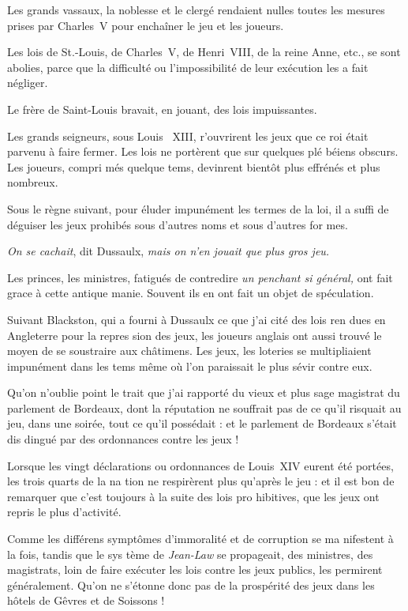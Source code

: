 Les grands vassaux, la noblesse et
le clergé rendaient nulles toutes les
mesures prises par Charles~V pour
enchaîner le jeu et les joueurs.

Les lois de St.-Louis, de Charles~V,
de Henri~VIII, de la reine Anne, etc.,
se sont abolies, parce que la difficulté
ou l'impossibilité de leur exécution
les a fait négliger.

Le frère de Saint-Louis bravait, en
jouant, des lois impuissantes.

Les grands seigneurs, sous Louis~%
XIII, r'ouvrirent les jeux que ce roi
était parvenu à faire fermer. Les lois
ne portèrent que sur quelques plé%
béiens obscurs. Les joueurs, compri%
més quelque tems, devinrent bientôt
plus effrénés et plus nombreux.

Sous le règne suivant, pour éluder 
impunément les termes de la loi, il a
suffi de déguiser les jeux prohibés sous
d'autres noms et sous d'autres for%
mes.

\emph{On se cachait}, dit Dussaulx, \emph{mais
on n'en jouait que plus gros jeu.}

Les princes, les ministres, fatigués
de contredire \emph{un penchant si général,}
ont fait grace à cette antique manie.
Souvent ils en ont fait un objet de
spéculation.

Suivant Blackston, qui a fourni à
Dussaulx ce que j'ai cité des lois ren%
dues en Angleterre pour la repres%
sion des jeux, les joueurs anglais ont
aussi trouvé le moyen de se soustraire
aux châtimens. Les jeux, les loteries
se multipliaient impunément dans les
tems même où l'on paraissait le plus 
sévir contre eux.

Qu'on n'oublie point le trait que
j'ai rapporté du vieux et plus sage
magistrat du parlement de Bordeaux,
dont la réputation ne souffrait pas de 
ce qu'il risquait au jeu, dans une
soirée, tout ce qu'il possédait : et le
parlement de Bordeaux s'était dis%
dingué par des ordonnances contre
les jeux !

Lorsque les vingt déclarations ou
ordonnances de Louis~XIV eurent
été portées, les trois quarts de la na%
tion ne respirèrent plus qu'après le
jeu : et il est bon de remarquer que
c'est toujours à la suite des lois pro%
hibitives, que les jeux ont repris le
plus d'activité.

Comme les différens symptômes
d'immoralité et de corruption se ma%
nifestent à la fois, tandis que le sys%
tème de \emph{Jean-Law} se propageait,
des ministres, des magistrats, loin de
faire exécuter les lois contre les jeux
publics, les permirent généralement.
Qu'on ne s'étonne donc pas de la
prospérité des jeux dans les hôtels de
Gêvres et de Soissons !

